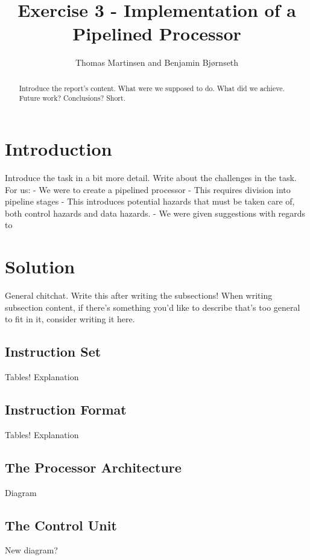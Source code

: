 \documentclass[11pt]{article}
\title{Exercise 3 - Implementation of a Pipelined Processor}
\author{Thomas Martinsen and Benjamin Bj\o rnseth}
\begin{document}
\maketitle

\begin{abstract}
  Introduce the report's content. What were we supposed to do. What
  did we achieve. Future work? Conclusions? Short.
\end{abstract}

\section{Introduction}
\label{sec:introduction}
Introduce the task in a bit more detail. Write about the challenges in
the task. For us:
 - We were to create a pipelined processor
 - This requires division into pipeline stages 
 - This introduces potential hazards that must be taken care of, both control hazards and data
hazards.  
- We were given suggestions with regards to

\section{Solution}
\label{sec:solution} General chitchat. Write this after writing the
subsections!  When writing subsection content, if there's something
you'd like to describe that's too general to fit in it, consider
writing it here.

\subsection{Instruction Set}
\label{subsec:instructionset} Tables! Explanation

\subsection{Instruction Format}
\label{subsec:instructionformat} Tables! Explanation

\subsection{The Processor Architecture}
\label{subsec:processor} Diagram

\subsection{The Control Unit}
\label{subsec:controlunit} New diagram?
\end{document}
